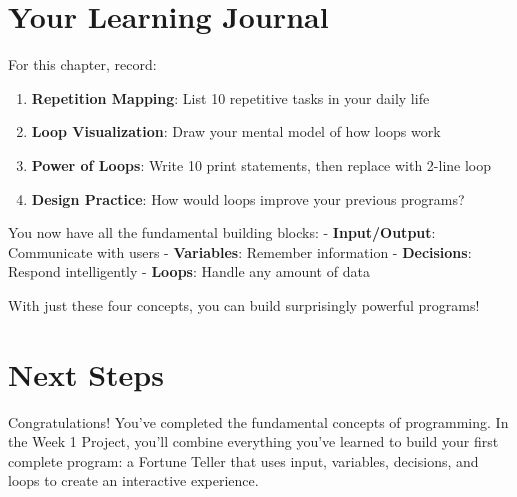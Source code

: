 \documentclass[
  letterpaper,
  DIV=11,
  numbers=noendperiod,
  oneside]{scrreprt}
\providecommand{\tightlist}{%
  \setlength{\itemsep}{0pt}\setlength{\parskip}{0pt}}\usepackage{longtable,booktabs,array}
\begin{document}
\section{Your Learning Journal}\label{your-learning-journal-5}

For this chapter, record:

\begin{enumerate}
\def\labelenumi{\arabic{enumi}.}
\tightlist
\item
  \textbf{Repetition Mapping}: List 10 repetitive tasks in your daily
  life
\item
  \textbf{Loop Visualization}: Draw your mental model of how loops work
\item
  \textbf{Power of Loops}: Write 10 print statements, then replace with
  2-line loop
\item
  \textbf{Design Practice}: How would loops improve your previous
  programs?
\end{enumerate}

\begin{tcolorbox}[enhanced jigsaw, opacityback=0, colback=white, colframe=quarto-callout-tip-color-frame, breakable, titlerule=0mm, coltitle=black, rightrule=.15mm, colbacktitle=quarto-callout-tip-color!10!white, left=2mm, bottomtitle=1mm, bottomrule=.15mm, title=\textcolor{quarto-callout-tip-color}{\faLightbulb}\hspace{0.5em}{The Complete Toolkit}, opacitybacktitle=0.6, toptitle=1mm, leftrule=.75mm, arc=.35mm, toprule=.15mm]

You now have all the fundamental building blocks: -
\textbf{Input/Output}: Communicate with users - \textbf{Variables}:
Remember information - \textbf{Decisions}: Respond intelligently -
\textbf{Loops}: Handle any amount of data

With just these four concepts, you can build surprisingly powerful
programs!

\end{tcolorbox}

\section{Next Steps}\label{next-steps-5}

Congratulations! You've completed the fundamental concepts of
programming. In the Week 1 Project, you'll combine everything you've
learned to build your first complete program: a Fortune Teller that uses
input, variables, decisions, and loops to create an interactive
experience.
\end{document}
